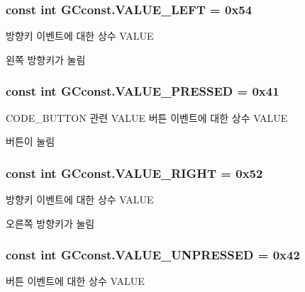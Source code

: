 \subsubsection[{V\+A\+L\+U\+E\+\_\+\+L\+E\+F\+T}]{\setlength{\rightskip}{0pt plus 5cm}const int G\+Cconst.\+V\+A\+L\+U\+E\+\_\+\+L\+E\+F\+T = 0x54}\label{class_g_cconst_a3907d5bdd4ff673e4a57380a701bf110}
방향키 이벤트에 대한 상수 V\+A\+L\+U\+E

왼쪽 방향키가 눌림 \hypertarget{class_g_cconst_ab29addae403721e28db58d3d588d7cb6}{}
\subsubsection[{V\+A\+L\+U\+E\+\_\+\+P\+R\+E\+S\+S\+E\+D}]{\setlength{\rightskip}{0pt plus 5cm}const int G\+Cconst.\+V\+A\+L\+U\+E\+\_\+\+P\+R\+E\+S\+S\+E\+D = 0x41}\label{class_g_cconst_ab29addae403721e28db58d3d588d7cb6}
C\+O\+D\+E\+\_\+\+B\+U\+T\+T\+O\+N 관련 V\+A\+L\+U\+E 버튼 이벤트에 대한 상수 V\+A\+L\+U\+E

버튼이 눌림 \hypertarget{class_g_cconst_ad572252971cc0adfaf37afda6b160bb4}{}
\subsubsection[{V\+A\+L\+U\+E\+\_\+\+R\+I\+G\+H\+T}]{\setlength{\rightskip}{0pt plus 5cm}const int G\+Cconst.\+V\+A\+L\+U\+E\+\_\+\+R\+I\+G\+H\+T = 0x52}\label{class_g_cconst_ad572252971cc0adfaf37afda6b160bb4}
방향키 이벤트에 대한 상수 V\+A\+L\+U\+E

오른쪽 방향키가 눌림 \hypertarget{class_g_cconst_ae71573553c10f6fa0dce4c8ef2a27e10}{}
\subsubsection[{V\+A\+L\+U\+E\+\_\+\+U\+N\+P\+R\+E\+S\+S\+E\+D}]{\setlength{\rightskip}{0pt plus 5cm}const int G\+Cconst.\+V\+A\+L\+U\+E\+\_\+\+U\+N\+P\+R\+E\+S\+S\+E\+D = 0x42}\label{class_g_cconst_ae71573553c10f6fa0dce4c8ef2a27e10}
버튼 이벤트에 대한 상수 V\+A\+L\+U\+E

